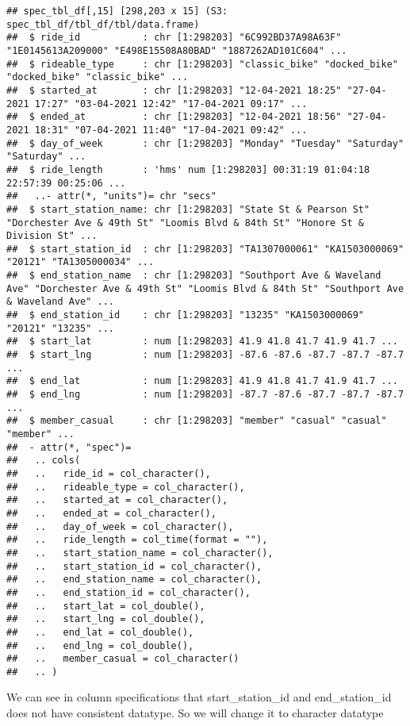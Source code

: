 \documentclass[
]{article}
\begin{document}
\begin{verbatim}
## spec_tbl_df[,15] [298,203 x 15] (S3: spec_tbl_df/tbl_df/tbl/data.frame)
##  $ ride_id           : chr [1:298203] "6C992BD37A98A63F" "1E0145613A209000" "E498E15508A80BAD" "1887262AD101C604" ...
##  $ rideable_type     : chr [1:298203] "classic_bike" "docked_bike" "docked_bike" "classic_bike" ...
##  $ started_at        : chr [1:298203] "12-04-2021 18:25" "27-04-2021 17:27" "03-04-2021 12:42" "17-04-2021 09:17" ...
##  $ ended_at          : chr [1:298203] "12-04-2021 18:56" "27-04-2021 18:31" "07-04-2021 11:40" "17-04-2021 09:42" ...
##  $ day_of_week       : chr [1:298203] "Monday" "Tuesday" "Saturday" "Saturday" ...
##  $ ride_length       : 'hms' num [1:298203] 00:31:19 01:04:18 22:57:39 00:25:06 ...
##   ..- attr(*, "units")= chr "secs"
##  $ start_station_name: chr [1:298203] "State St & Pearson St" "Dorchester Ave & 49th St" "Loomis Blvd & 84th St" "Honore St & Division St" ...
##  $ start_station_id  : chr [1:298203] "TA1307000061" "KA1503000069" "20121" "TA1305000034" ...
##  $ end_station_name  : chr [1:298203] "Southport Ave & Waveland Ave" "Dorchester Ave & 49th St" "Loomis Blvd & 84th St" "Southport Ave & Waveland Ave" ...
##  $ end_station_id    : chr [1:298203] "13235" "KA1503000069" "20121" "13235" ...
##  $ start_lat         : num [1:298203] 41.9 41.8 41.7 41.9 41.7 ...
##  $ start_lng         : num [1:298203] -87.6 -87.6 -87.7 -87.7 -87.7 ...
##  $ end_lat           : num [1:298203] 41.9 41.8 41.7 41.9 41.7 ...
##  $ end_lng           : num [1:298203] -87.7 -87.6 -87.7 -87.7 -87.7 ...
##  $ member_casual     : chr [1:298203] "member" "casual" "casual" "member" ...
##  - attr(*, "spec")=
##   .. cols(
##   ..   ride_id = col_character(),
##   ..   rideable_type = col_character(),
##   ..   started_at = col_character(),
##   ..   ended_at = col_character(),
##   ..   day_of_week = col_character(),
##   ..   ride_length = col_time(format = ""),
##   ..   start_station_name = col_character(),
##   ..   start_station_id = col_character(),
##   ..   end_station_name = col_character(),
##   ..   end_station_id = col_character(),
##   ..   start_lat = col_double(),
##   ..   start_lng = col_double(),
##   ..   end_lat = col_double(),
##   ..   end_lng = col_double(),
##   ..   member_casual = col_character()
##   .. )
\end{verbatim}

We can see in column specifications that start\_station\_id and
end\_station\_id does not have consistent datatype. So we will change it
to character datatype
\end{document}
